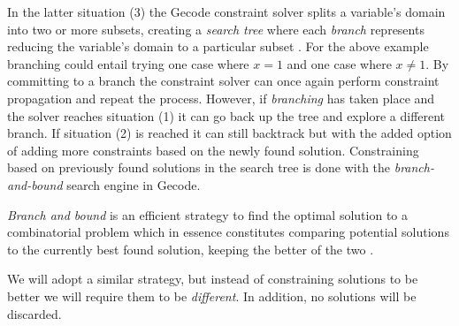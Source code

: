 In the latter situation (3) the Gecode constraint solver splits a variable's domain into
two or more subsets, creating a \textit{search tree} where each \textit{branch} represents
reducing the variable's domain to a particular subset \cite[Section~8]{MPG}. For the above
example branching could entail trying one case where $x=1$ and one case where $x\neq1$.
By committing to a branch the constraint solver can once again perform constraint
propagation and repeat the process. However, if \textit{branching} has taken place and the
solver reaches situation (1) it can go back up the tree and explore a different branch.
If situation (2) is reached it can still backtrack but with the added option of adding
more constraints based on the newly found solution. Constraining based on previously found
solutions in the search tree is done with the \textit{branch-and-bound} search
engine \cite[Section~9]{MPG} in Gecode.

\textit{Branch and bound} is an efficient strategy to find the optimal solution to a
combinatorial problem which in essence constitutes comparing potential solutions to the
currently best found solution, keeping the better of the two \cite{BaB}.

We will adopt a similar strategy, but instead of constraining solutions to be better we
will require them to be \textit{different}. In addition, no solutions will be discarded.
